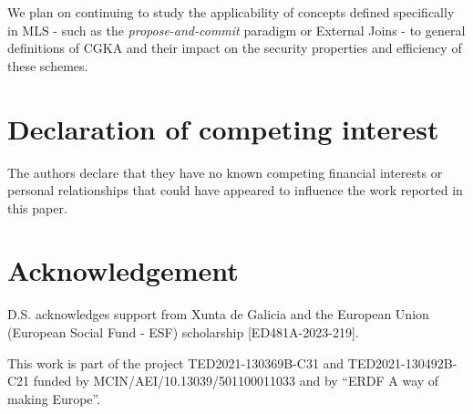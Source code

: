 \documentclass[preprint, 12pt]{elsarticle}
\begin{document}
We plan on continuing to study the applicability of concepts defined specifically in MLS - such as the \textit{propose-and-commit} paradigm or External Joins \cite{aa_cgka} - to general definitions of CGKA and their impact on the security properties and efficiency of these schemes.

\section*{Declaration of competing interest}

The authors declare that they have no known competing financial interests or 
personal relationships that could have appeared to influence the work reported 
in this paper.

\section*{Acknowledgement}

D.S. acknowledges support from Xunta de Galicia and the European Union 
(European Social Fund - ESF) scholarship [ED481A-2023-219].

This work is part of the project TED2021-130369B-C31 and TED2021-130492B-C21
funded by MCIN/AEI/10.13039/501100011033 and by “ERDF A way of making Europe”.

 

\end{document}

